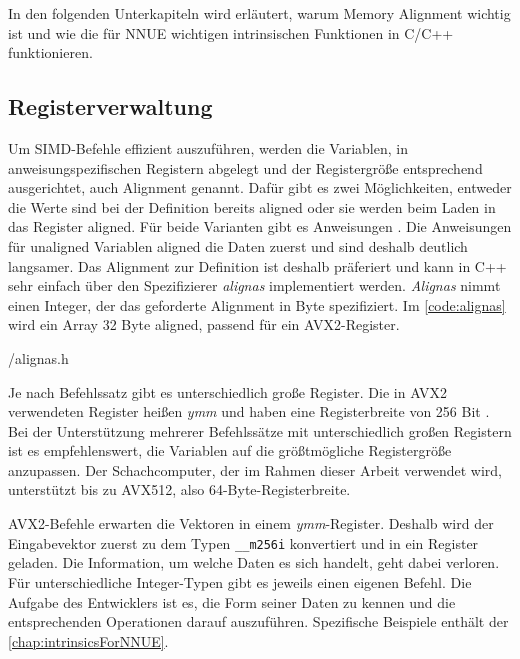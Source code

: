 In den folgenden Unterkapiteln wird erläutert, warum Memory Alignment wichtig ist und wie die für \ac{NNUE} wichtigen intrinsischen Funktionen in C/C++ funktionieren.

\subsection{Registerverwaltung}

Um \ac{SIMD}-Befehle effizient auszuführen, werden die Variablen, in anweisungspezifischen Registern abgelegt und der Registergröße entsprechend ausgerichtet, auch Alignment genannt. Dafür gibt es zwei Möglichkeiten, entweder die Werte sind bei der Definition bereits aligned oder sie werden beim Laden in das Register aligned. Für beide Varianten gibt es Anweisungen \cite{intelIntrinsics}. Die Anweisungen für unaligned Variablen aligned die Daten zuerst und sind deshalb deutlich langsamer. Das Alignment zur Definition ist deshalb präferiert und kann in C++ sehr einfach über den Spezifizierer \emph{alignas} implementiert werden. \emph{Alignas} nimmt einen Integer, der das geforderte Alignment in Byte spezifiziert. Im \autoref{code:alignas} wird ein Array 32 Byte aligned, passend für ein \ac{AVX2}-Register.


{\srcloc/alignas.h}

Je nach Befehlssatz gibt es unterschiedlich große Register. Die in \ac{AVX2} verwendeten Register heißen \emph{ymm} und haben eine Registerbreite von 256 Bit \cite{intelIntrinsics}. Bei der Unterstützung mehrerer Befehlssätze mit unterschiedlich großen Registern ist es empfehlenswert, die Variablen auf die größtmögliche Registergröße anzupassen. Der Schachcomputer, der im Rahmen dieser Arbeit verwendet wird, unterstützt bis zu \ac{AVX512}, also 64-Byte-Registerbreite.

\ac{AVX2}-Befehle erwarten die Vektoren in einem \emph{ymm}-Register. Deshalb wird der Eingabevektor zuerst zu dem Typen \lstinline[language=C++]{__m256i} konvertiert und in ein Register geladen. Die Information, um welche Daten es sich handelt, geht dabei verloren. Für unterschiedliche Integer-Typen gibt es jeweils einen eigenen Befehl. Die Aufgabe des Entwicklers ist es, die Form seiner Daten zu kennen und die entsprechenden Operationen darauf auszuführen. Spezifische Beispiele enthält der \autoref{chap:intrinsicsForNNUE}.

